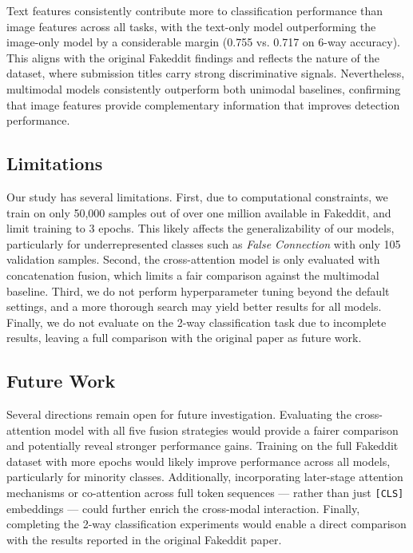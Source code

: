 Text features consistently contribute more to classification performance than image features across all tasks, with the text-only model outperforming the image-only model by a considerable margin (0.755 vs. 0.717 on 6-way accuracy). This aligns with the original Fakeddit findings and reflects the nature of the dataset, where submission titles carry strong discriminative signals. Nevertheless, multimodal models consistently outperform both unimodal baselines, confirming that image features provide complementary information that improves detection performance.

\subsection{Limitations}

Our study has several limitations. First, due to computational constraints, we train on only 50,000 samples out of over one million available in Fakeddit, and limit training to 3 epochs. This likely affects the generalizability of our models, particularly for underrepresented classes such as \textit{False Connection} with only 105 validation samples. Second, the cross-attention model is only evaluated with concatenation fusion, which limits a fair comparison against the multimodal baseline. Third, we do not perform hyperparameter tuning beyond the default settings, and a more thorough search may yield better results for all models. Finally, we do not evaluate on the 2-way classification task due to incomplete results, leaving a full comparison with the original paper as future work.

\subsection{Future Work}

Several directions remain open for future investigation. Evaluating the cross-attention model with all five fusion strategies would provide a fairer comparison and potentially reveal stronger performance gains. Training on the full Fakeddit dataset with more epochs would likely improve performance across all models, particularly for minority classes. Additionally, incorporating later-stage attention mechanisms or co-attention across full token sequences — rather than just \texttt{[CLS]} embeddings — could further enrich the cross-modal interaction. Finally, completing the 2-way classification experiments would enable a direct comparison with the results reported in the original Fakeddit paper.